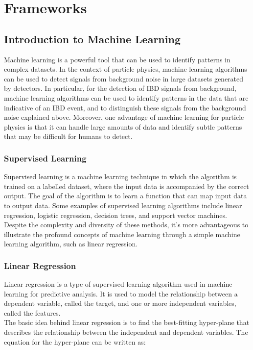 \chapter{Frameworks}
\section{Introduction to Machine Learning}

Machine learning is a powerful tool that can be used to identify patterns in complex datasets. In the context of particle physics, machine learning algorithms can be used to detect signals from background noise in large datasets generated by detectors. In particular, for the detection of IBD signals from background, machine learning algorithms can be used to identify patterns in the data that are indicative of an IBD event, and to distinguish these signals from the background noise explained above. Moreover, one advantage of machine learning for particle physics is that it can handle large amounts of data and identify subtle patterns that may be difficult for humans to detect.
\\


\subsection{Supervised Learning}

Supervised learning is a machine learning technique in which the algorithm is trained on a labelled dataset, where the input data is accompanied by the correct output. The goal of the algorithm is to learn a function that can map input data to output data. Some examples of supervised learning algorithms include linear regression, logistic regression, decision trees, and support vector machines. Despite the complexity and diversity of these methods, it's more advantageous to illustrate the profound concepts of machine learning through a simple machine learning algorithm, such as linear regression. 

\subsection{Linear Regression}
Linear regression is a type of supervised learning algorithm used in machine learning for predictive analysis. It is used to model the relationship between a dependent variable, called the target, and one or more independent variables, called the features.
\\
The basic idea behind linear regression is to find the best-fitting hyper-plane that describes the relationship between the independent and dependent variables. The equation for the hyper-plane can be written as:

